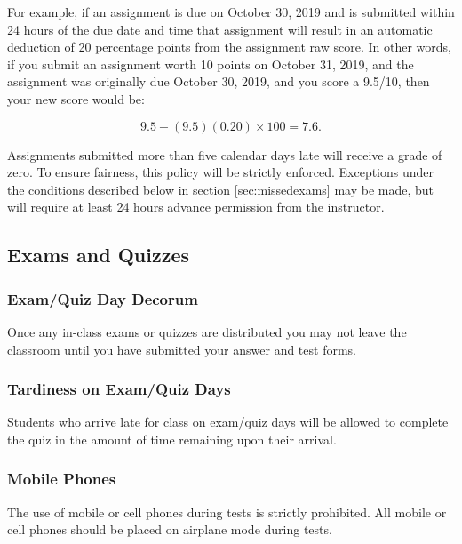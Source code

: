 \documentclass[article]{article}
\begin{document}
For example, if an assignment is due on October 30, 2019 and is submitted within 24 hours of the due date and time that assignment will result in an automatic deduction of 20 percentage points from the assignment raw score.  In other words, if you submit an assignment worth 10 points on October 31, 2019, and the assignment was originally due October 30, 2019, and you score a 9.5/10, then your new score would be:

\begin{equation}
9.5 - (9.5)(0.20) \times 100 = 7.6.
\end{equation}

Assignments submitted more than five calendar days late will receive a grade of zero.  To ensure fairness, this policy will be strictly enforced.  Exceptions under the conditions described below in section \ref{sec:missedexams} may be made, but will require at least 24 hours advance permission from the instructor.

\subsection{Exams and Quizzes} \label{sec:exams}

\subsubsection{Exam/Quiz Day Decorum} \label{sec:decorum}
Once any in-class exams or quizzes are distributed you may not leave the classroom until you have submitted your answer and test forms.

\subsubsection{Tardiness on Exam/Quiz Days} \label{sec:late}
Students who arrive late for class on exam/quiz days will be allowed to complete the quiz in the amount of time remaining upon their arrival.

\subsubsection{Mobile Phones} \label{sec:examphones}
The use of mobile or cell phones during tests is strictly prohibited. All mobile or cell phones should be placed on airplane mode during tests.
\end{document}
